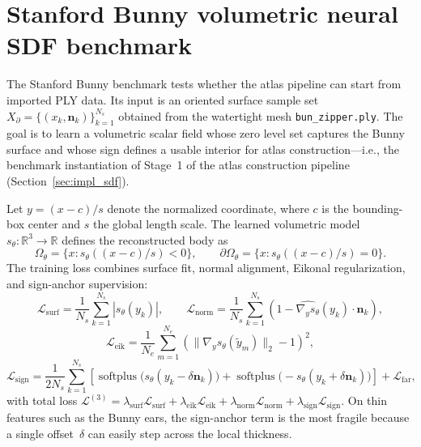 \documentclass[sort&compress]{svjour3} %
\begin{document}
\section{Stanford Bunny volumetric neural SDF benchmark}
\label{sec:appendix_bunny}

The Stanford Bunny benchmark tests whether the atlas pipeline can start from imported PLY data. Its input is an oriented surface sample set $X_{\partial}=\{(x_k,\mathbf{n}_k)\}_{k=1}^{N_s}$ obtained from the watertight mesh \texttt{bun\_zipper.ply}. The goal is to learn a volumetric scalar field whose zero level set captures the Bunny surface and whose sign defines a usable interior for atlas construction---i.e., the benchmark instantiation of Stage~1 of the atlas construction pipeline (Section~\ref{sec:impl_sdf}).

Let $y=(x-c)/s$ denote the normalized coordinate, where $c$ is the bounding-box center and $s$ the global length scale. The learned volumetric model $s_\theta:\mathbb{R}^3\to\mathbb{R}$ defines the reconstructed body as
\begin{equation}
\Omega_\theta=\{x:s_\theta((x-c)/s)<0\},
\qquad
\partial\Omega_\theta=\{x:s_\theta((x-c)/s)=0\}.
\label{eq:bunny_sdf_body}
\end{equation}
The training loss combines surface fit, normal alignment, Eikonal regularization, and sign-anchor supervision:
\begin{equation}
\mathcal{L}_{\mathrm{surf}}
=
\frac{1}{N_s}\sum_{k=1}^{N_s}\left|s_\theta(y_k)\right|,
\qquad
\mathcal{L}_{\mathrm{norm}}
=
\frac{1}{N_s}\sum_{k=1}^{N_s}\left(1-\widehat{\nabla_y s_\theta}(y_k)\cdot \mathbf{n}_k\right),
\label{eq:bunny_sdf_surface_normal}
\end{equation}
\begin{equation}
\mathcal{L}_{\mathrm{eik}}
=
\frac{1}{N_e}\sum_{m=1}^{N_e}
\left(\|\nabla_y s_\theta(\tilde y_m)\|_2-1\right)^2,
\label{eq:bunny_sdf_eikonal}
\end{equation}
\begin{equation}
\mathcal{L}_{\mathrm{sign}}
=
\frac{1}{2N_s}\sum_{k=1}^{N_s}
\left[
\operatorname{softplus}\!\big(s_\theta(y_k-\delta \mathbf{n}_k)\big)
+
\operatorname{softplus}\!\big(-s_\theta(y_k+\delta \mathbf{n}_k)\big)
\right]
+
\mathcal{L}_{\mathrm{far}},
\label{eq:bunny_sdf_sign}
\end{equation}
with total loss $\mathcal{L}^{(3)} = \lambda_{\mathrm{surf}}\mathcal{L}_{\mathrm{surf}} + \lambda_{\mathrm{eik}}\mathcal{L}_{\mathrm{eik}} + \lambda_{\mathrm{norm}}\mathcal{L}_{\mathrm{norm}} + \lambda_{\mathrm{sign}}\mathcal{L}_{\mathrm{sign}}$. On thin features such as the Bunny ears, the sign-anchor term is the most fragile because a single offset~$\delta$ can easily step across the local thickness.
\end{document}
